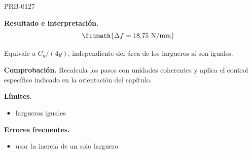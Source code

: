 \begin{studiumworked}{PRB-0127}
\begin{enumerate}
\end{enumerate}

\textbf{Resultado e interpretación.}\[\fitmath{\Delta f = 18{,}75\ \mathrm{N/mm}}\]

Equivale a $C_y/(4y)$, independiente del área de los largueros si son iguales.

\par\textbf{Comprobación.} Recalcula los pasos con unidades coherentes y aplica el control específico indicado en la orientación del capítulo.

\textbf{Límites.}\begin{itemize}\item largueros iguales\end{itemize}

\textbf{Errores frecuentes.}\begin{itemize}\item usar la inercia de un solo larguero\end{itemize}

\end{studiumworked}

\Needspace{.3\textheight}

